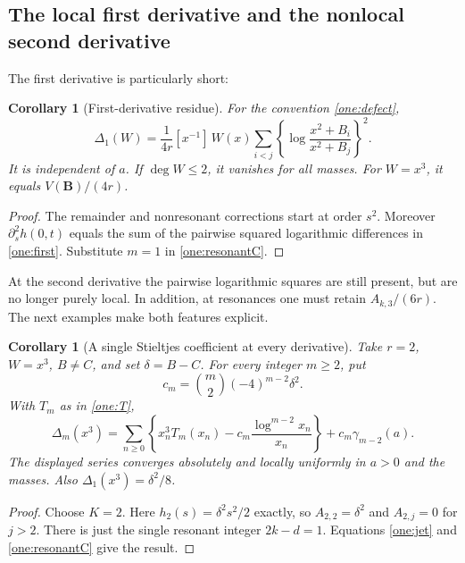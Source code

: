 \documentclass[11pt,a4paper]{article}
\numberwithin{equation}{section}
\theoremstyle{plain}
\newtheorem{corollary}[theorem]{Corollary}
\theoremstyle{definition}
\theoremstyle{remark}
\begin{document}
\subsection{The local first derivative and the nonlocal second derivative}

The first derivative is particularly short:
\begin{corollary}[First-derivative residue]\label{cor:firstanomaly}
For the convention \eqref{one:defect},
\begin{equation}\label{one:first}
 \Delta_1(W)=\frac1{4r}[x^{-1}]\,W(x)
       \sum_{i<j}\left\{\log\frac{x^2+B_i}{x^2+B_j}\right\}^{\!2}.
\end{equation}
It is independent of $a$.  If $\deg W\le2$, it vanishes for all masses.
For $W=x^3$, it equals $V(\boldsymbol B)/(4r)$.
\end{corollary}
\begin{proof}
The remainder and nonresonant corrections start at order $s^2$.
Moreover $\partial_s^2h(0,t)$ equals the sum of the pairwise squared
logarithmic differences in \eqref{one:first}.  Substitute $m=1$
in \eqref{one:resonantC}.
\end{proof}

At the second derivative the pairwise logarithmic squares are still
present, but are no longer purely local.  In addition, at resonances
one must retain $A_{k,3}/(6r)$.  The next examples make both features
explicit.

\begin{corollary}[A single Stieltjes coefficient at every derivative]
\label{cor:singleStieltjes}
Take $r=2$, $W=x^3$, $B\ne C$, and set $\delta=B-C$.
For every integer $m\ge2$, put
\begin{equation}\label{one:cm}
 c_m=\binom m2(-4)^{m-2}\delta^2.
\end{equation}
With $T_m$ as in \eqref{one:T},
\begin{equation}\label{one:isolated}
 \boxed{\displaystyle
 \Delta_m(x^3)=
   \sum_{n\ge0}\left\{x_n^3T_m(x_n)
                -c_m\frac{\log^{m-2}x_n}{x_n}\right\}
       +c_m\gamma_{m-2}(a).}
\end{equation}
The displayed series converges absolutely and locally uniformly in
$a>0$ and the masses.  Also $\Delta_1(x^3)=\delta^2/8$.
\end{corollary}
\begin{proof}
Choose $K=2$.  Here $h_2(s)=\delta^2s^2/2$ exactly, so
$A_{2,2}=\delta^2$ and $A_{2,j}=0$ for $j>2$.
There is just the single resonant integer $2k-d=1$.  Equations
\eqref{one:jet} and \eqref{one:resonantC} give the result.
\end{proof}
\end{document}
